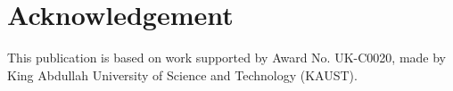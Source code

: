 \documentclass{llncs}
\begin{document}















% 




\section*{Acknowledgement}
This publication is based on work supported by Award No. UK-C0020, made by King Abdullah University of Science and Technology (KAUST).




\end{document}
